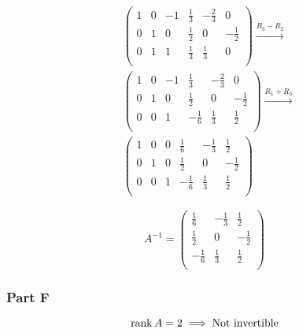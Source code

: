 \documentclass[12pt,titlepage]{extarticle}
\begin{document}
\begin{align*}
    & \left(\begin{array}{cccccc}1&0&-1&\frac{1}{3}&-\frac{2}{3}&0\\0&1&0&\frac{1}{2}&0&-\frac{1}{2}\\0&1&1&\frac{1}{3}&\frac{1}{3}&0\\\end{array}\right) \xrightarrow{R_3 - R_2} \\
    & \left(\begin{array}{cccccc}1&0&-1&\frac{1}{3}&-\frac{2}{3}&0\\0&1&0&\frac{1}{2}&0&-\frac{1}{2}\\0&0&1&-\frac{1}{6}&\frac{1}{3}&\frac{1}{2}\\\end{array}\right) \xrightarrow{R_1 + R_3} \\
    & \left(\begin{array}{cccccc}1&0&0&\frac{1}{6}&-\frac{1}{3}&\frac{1}{2}\\0&1&0&\frac{1}{2}&0&-\frac{1}{2}\\0&0&1&-\frac{1}{6}&\frac{1}{3}&\frac{1}{2}\\\end{array}\right)
\end{align*}

\[
    A^{-1} = \left(\begin{array}{ccc}\frac{1}{6}&-\frac{1}{3}&\frac{1}{2}\\\frac{1}{2}&0&-\frac{1}{2}\\-\frac{1}{6}&\frac{1}{3}&\frac{1}{2}\\\end{array}\right)
\]
\subsubsection*{Part F}
\[
    \rank A = 2 \implies \text{Not invertible}
\]
\end{document}
